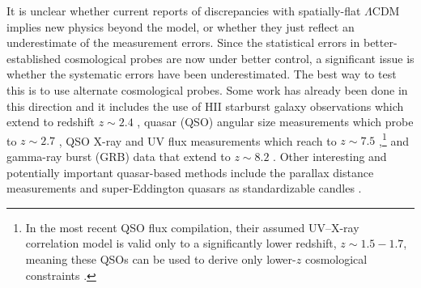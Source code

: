 \documentclass[a4paper,fleqn,usenatbib]{mnras}
\begin{document}
It is unclear whether current reports of discrepancies with spatially-flat $\Lambda$CDM implies new physics beyond the model, or whether they just reflect an underestimate of the measurement errors. Since the statistical errors in better-established cosmological probes are now under better control, a significant issue is whether the systematic errors have been underestimated. The best way to test this is to use alternate cosmological probes. Some work has already been done in this direction and it includes the use of HII starburst galaxy observations which extend to redshift $z \sim 2.4$ \citep{ManiaRatra2012, Chavezetal2014, GonzalezMoran2019, GonzalezMoranetal2021, Caoetal2020, Caoetal2021a, Caoetal_2021c, Johnsonetal2021, Mehrabietal2022}, quasar (QSO) angular size measurements which probe to $z \sim 2.7$ \citep{Caoetal2017, Ryanetal2019, Caoetal2020, Caoetal2021b, Zhengetal2021, Lianetal2021}, QSO X-ray and UV flux measurements which reach to $z \sim 7.5$ \citep{RisalitiLusso2015, RisalitiLusso2019, KhadkaRatra2020a, KhadkaRatra2020b, KhadkaRatra2021a, KhadkaRatra2021b, Yangetal2020, Lussoetal2020, ZhaoXia2021, Lietal2021, Lianetal2021, Rezaeietal2021, Luongoetal2021},\footnote{In the most recent \cite{Lussoetal2020} QSO flux compilation, their  assumed UV--X-ray correlation model is valid only to a significantly lower redshift, $z \sim 1.5-1.7$, meaning these QSOs can be used to derive only lower-$z$ cosmological constraints \citep{KhadkaRatra2021a, KhadkaRatra2021b}.} and gamma-ray burst (GRB) data that extend to $z \sim 8.2$ \citep{Wang_2016, Wangetal2021, Dirirsa2019, Amati2019, KhadkaRatra2020c, Khadkaetal2021a, Demianskietal_2021, Luongoetal2021, Huetal2021, OrlandoMarco2021, Caoetal2021d, Caoetal2022, CaoRatra2022}. Other interesting and potentially important quasar-based methods include the parallax distance measurements \citep{wang_parallax2020,GRAVITY2021} and super-Eddington quasars as standardizable candles \citep{wang2013,marziani2014,marziani_atom2019}.
\end{document}
